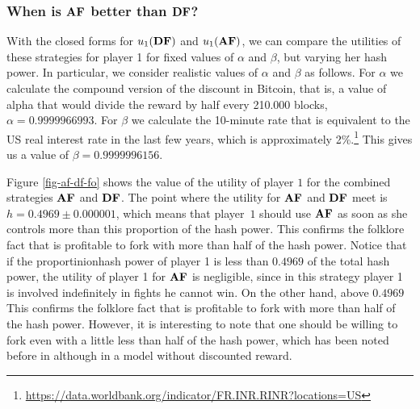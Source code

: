 \subsubsection{When is $\text{\rm {\bf AF}}$ better than $\text{\rm {\bf DF}}$?}
With the closed forms for $u_1(\text{\rm {\bf DF}})$ and $u_1(\text{\rm {\bf AF}})$,
we can compare the utilities of these strategies for player 1 for fixed values of $\alpha$ and $\beta$, but varying her hash power. In particular, we consider realistic values of $\alpha$ and $\beta$ as follows. For $\alpha$ we calculate the compound version of the discount in Bitcoin, that is, 
a value of alpha that would divide the reward by half every 210.000 blocks, \ie $\alpha = 0.9999966993$. For 
$\beta$ we calculate the 10-minute rate that is equivalent to the US real interest rate in 
the last few years, which is approximately 2\%.\footnote{\url{https://data.worldbank.org/indicator/FR.INR.RINR?locations=US}}
This gives us a value of $\beta = 0.9999996156$. 

Figure \ref{fig-af-df-fo} shows the value of the utility of player $1$ for the combined strategies $\text{\rm {\bf AF}}$ 
and $\text{\rm {\bf DF}}$.
The point where the utility for $\text{\rm {\bf AF}}$ and $\text{\rm {\bf DF}}$ meet is $h = 0.4969 \pm 0.000001$,
which means that player~$1$ should use $\text{\rm {\bf AF}}$ as soon as she controls more than this proportion of the hash power. 
This confirms the 
folklore fact that is profitable to fork with more than half of the hash power. 
Notice that if the proportinionhash power of player 1 is less than $0.4969$ of the total hash power, the utility of player 1 for $\text{\rm {\bf AF}}$ is negligible, since in this strategy player 1 is involved indefinitely in fights he cannot win. On the other hand, above $0.4969$
This confirms the 
folklore fact that is profitable to fork with more than half of the hash power. However, it is interesting to note that
one should be willing to fork even with a little less than half of the hash power, which has been noted before in \cite{mininggames:2016} although in a model without discounted reward.

